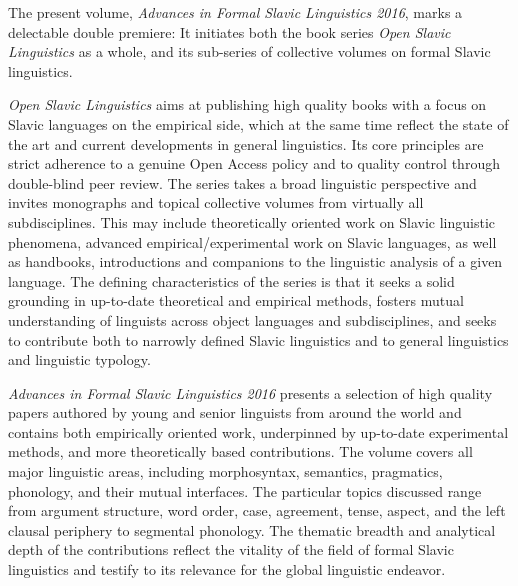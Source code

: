 \begin{refsection}

The present volume, \textit{Advances in Formal Slavic Linguistics 2016}, marks a delectable double premiere: It initiates both the book series \textit{Open Slavic Linguistics} as a whole, and its sub-series of collective volumes on formal Slavic linguistics. 

\textit{Open Slavic Linguistics} aims at publishing high quality books with a focus on Slavic languages on the empirical side, which at the same time reflect the state of the art and current developments in general linguistics. Its core principles are strict adherence to a genuine Open Access policy and to quality control through double-blind peer review. The series takes a broad linguistic perspective and invites monographs and topical collective volumes from virtually all subdisciplines. This may include theoretically oriented work on Slavic linguistic phenomena, advanced empirical\slash experimental work on Slavic languages, as well as handbooks, introductions and companions to the linguistic analysis of a given language. The defining characteristics of the series is that it seeks a solid grounding in up-to-date theoretical and empirical methods, fosters mutual understanding of linguists across object languages and subdisciplines, and seeks to contribute both to narrowly defined Slavic linguistics and to general linguistics and linguistic typology. 

\textit{Advances in Formal Slavic Linguistics 2016} presents a selection of high quality papers authored by young and senior linguists from around the world and contains both empirically oriented work, underpinned by up-to-date experimental methods, and more theoretically based contributions. The volume covers all major linguistic areas, including morphosyntax, semantics, pragmatics, phonology, and their mutual interfaces. The particular topics discussed range from argument structure, word order, case, agreement, tense, aspect, and the left clausal periphery to segmental phonology. The thematic breadth and analytical depth of the contributions reflect the vitality of the field of formal Slavic linguistics and testify to its relevance for the global linguistic endeavor. 


\end{refsection}

